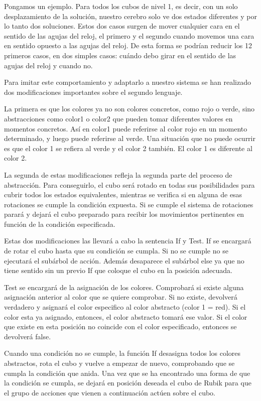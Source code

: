 Pongamos un ejemplo. Para todos los cubos de nivel 1, es decir, con un solo
desplazamiento de la solución, nuestro cerebro solo ve dos estados diferentes y
por lo tanto dos soluciones. Estos dos casos surgen de mover cualquier cara en el
sentido de las agujas del reloj, el primero y el segundo cuando movemos una cara
en sentido opuesto a las agujas del reloj. De esta forma se podrían reducir los
12 primeros casos, en dos simples casos: cuándo debo girar en el sentido de las
agujas del reloj y cuando no.

Para imitar este comportamiento y adaptarlo a nuestro sistema se han realizado
dos modificaciones importantes sobre el segundo lenguaje.

La primera es que los colores ya no son colores concretos, como rojo o verde,
sino abstracciones como color1 o color2 que pueden tomar diferentes valores en
momentos concretos. Así en color1 puede referirse al color rojo en un momento
determinado, y luego puede referirse al verde. Una situación que no puede ocurrir
es que el color 1 se refiera al verde y el color 2 también. El color 1 es
diferente al color 2.

La segunda de estas modificaciones refleja la segunda parte del proceso de
abstracción. Para conseguirlo, el cubo será rotado en todas sus posibilidades
para cubrir todos los estados equivalentes, mientras se verifica si en alguna de
esas rotaciones se cumple la condición expuesta. Si se cumple el sistema de
rotaciones parará y dejará el cubo preparado para recibir los movimientos
pertinentes en función de la condición especificada.

Estas dos modificaciones las llevará a cabo la sentencia If y Test. If se
encargará de rotar el cubo hasta que su condición se cumpla. Si no se cumple no
se ejecutará el subárbol de acción. Además desaparece el subárbol else ya que no
tiene sentido sin un previo If que coloque el cubo en la posición adecuada.

Test se encargará de la asignación de los colores. Comprobará si existe alguna
asignación anterior al color que se quiere comprobar. Si no existe, devolverá
verdadero y asignará el color especifico al color abstracto (color 1 = red). Si
el color esta ya asignado, entonces, el color abstracto tomará ese valor. Si el
color que existe en esta posición no coincide con el color especificado, entonces
se devolverá false.

Cuando una condición no se cumple, la función If desasigna todos los colores
abstractos, rota el cubo y vuelve a empezar de nuevo, comprobando que se cumpla
la condición que anida. Una vez que se ha encontrado una forma de que la
condición se cumpla, se dejará en posición deseada el cubo de Rubik para que el
grupo de acciones que vienen a continuación actúen sobre el cubo.

